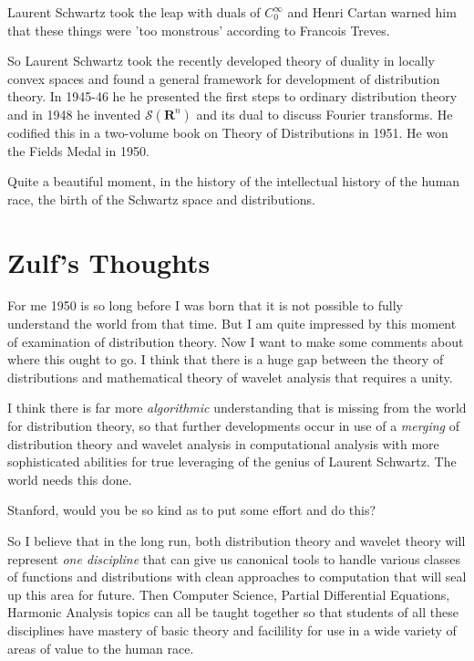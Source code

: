 \documentclass{amsart}
\begin{document}
Laurent Schwartz took the leap with duals of $C^{\infty}_0$ and Henri Cartan warned him that these things were 'too monstrous' according to Francois Treves.

So Laurent Schwartz took the recently developed theory of duality in locally convex spaces and found a general framework for development of distribution theory.  In 1945-46 he he presented the first steps to ordinary distribution theory and in 1948 he invented $\mathcal{S}(\mathbf{R}^n)$ and its dual to discuss Fourier transforms.  He codified this in a two-volume book on Theory of Distributions in 1951.  He won the Fields Medal in 1950.  

Quite a beautiful moment, in the history of the intellectual history of the human race, the birth of the Schwartz space and distributions.  

\section{Zulf's Thoughts}

For me 1950 is so long before I was born that it is not possible to fully understand the world from that time.  But I am quite impressed by this moment of examination of distribution theory.  Now I want to make some comments about where this ought to go.  I think that there is a huge gap between the theory of distributions and mathematical theory of wavelet analysis that requires a unity.

I think there is far more {\em algorithmic} understanding that is missing from the world for distribution theory, so that further developments occur in use of a {\em merging} of distribution theory and wavelet analysis in computational analysis with more sophisticated abilities for true leveraging of the genius of Laurent Schwartz.  The world needs this done.

Stanford, would you be so kind as to put some effort and do this?

So I believe that in the long run, both distribution theory and wavelet theory will represent {\em one discipline} that can give us canonical tools to handle various classes of functions and distributions with clean approaches to computation that will seal up this area for future.  Then Computer Science, Partial Differential Equations, Harmonic Analysis topics can all be taught together so that students of all these disciplines have mastery of basic theory and facilility for use in a wide variety of areas of value to the human race.  
\end{document}

